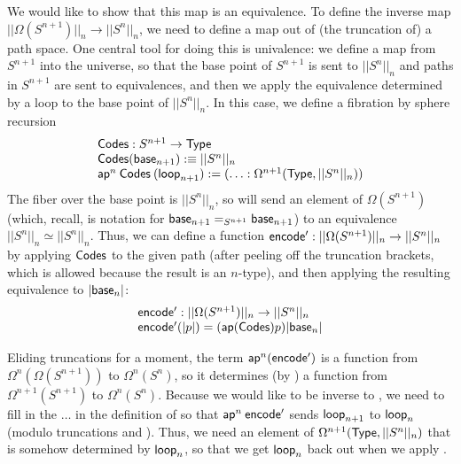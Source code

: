We would like to show that this map is an equivalence.  To define the
inverse map $||\Omega(S^{n+1})||_n \to ||S^n||_n$, we need to define a
map out of (the truncation of) a path space.  One central tool for doing
this is univalence: we define a map from $S^{n+1}$ into the universe, so
that the base point of $S^{n+1}$ is sent to $||S^n||_n$ and paths in $S^{n+1}$
are sent to equivalences, and then we apply the
equivalence determined by a loop to the base point of $||S^n||_n$.  In
this case, we define a fibration  by sphere recursion
\[
\begin{array}{l}
\mathsf{Codes} : S^{n+1} \to \mathsf{Type} \\
\mathsf{Codes}(\mathsf{base}_{n+1}) :\equiv ||S^{n}||_n \\
\mathsf{ap}^n \: \mathsf{Codes} \: (\mathsf{loop}_{n+1}) := (\ldots : \Omega^{n+1}(\mathsf{Type},||S^{n}||_n)) \\
\end{array}
\]
The fiber over the base point is $||S^{n}||_n$, so  will send
an element of $\Omega(S^{n+1})$ (which, recall, is notation for $\mathsf{base}_{n+1}
=_{S^{n+1}} \mathsf{base}_{n+1}$) to an equivalence $||S^{n}||_n \simeq
||S^{n}||_n$.  Thus, we can define a function $\mathsf{encode'} : ||\Omega(S^{n+1})||_n \to
||S^n||_n$ by applying $\mathsf{Codes}$ to the given path (after peeling
off the truncation brackets, which is allowed because the result is an $n$-type), and then
applying the resulting equivalence to $|\mathsf{base}_n|$:
\[
\begin{array}{l}
\mathsf{encode'} : ||\Omega(S^{n+1})||_n \to ||S^n||_n \\
\mathsf{encode'}(|p|) = (\mathsf{ap}(\mathsf{Codes}) p) |\mathsf{base}_n|
\end{array}
\]

Eliding truncations for a moment, the term $\mathsf{ap}^n(\mathsf{encode'})$
is a function from $\Omega^n(\Omega(S^{n+1}))$ to $\Omega^n(S^n)$, so it
determines (by ) a function from $\Omega^{n+1}(S^{n+1})$ to
$\Omega^n(S^n)$.  Because we would like 
to be inverse to , we need to fill in the $\ldots$ in the
definition of  so that $\mathsf{ap}^n \: \mathsf{encode'}$ sends
$\mathsf{loop}_{n+1}$ to $\mathsf{loop}_n$ (modulo truncations and ).  Thus, we need an element of
$\Omega^{n+1}(\mathsf{Type},||S^n||_n)$ that is somehow determined by 
$\mathsf{loop}_n$, so that we get $\mathsf{loop}_n$ back out when we apply .  

